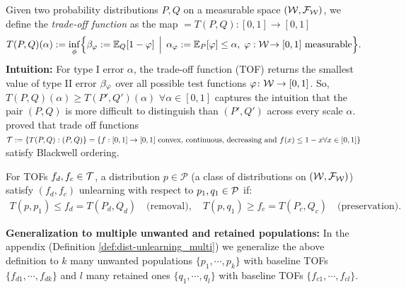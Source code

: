 \begin{definition}    \label{def:TOF} 
Given two probability distributions $P, Q$ on a measurable space $(\mathcal{W}, \mathcal{F}_{\mathcal{W}})$, we define the  \emph{trade-off function} as  the map $= T(P,Q):[0,1]\to[0,1]$  
\vspace{-1mm}
\begin{equation}\label{eq:TOF}
 T(P,Q)(\alpha):=
  \inf_{\phi}\Bigl\{
        \beta_{\varphi} := \mathbb{E}_{Q}[1-\varphi] 
        \,\Bigm\vert\,
        \alpha_{\varphi}:= \mathbb{E}_{P}[\varphi]\le \alpha,\;
        \varphi:\mathcal{W}\!\to[0,1]\text{ measurable}
      \Bigr\}.
\end{equation}
\textbf{Intuition:} For type I error $\alpha$, the trade-off function (TOF) returns the smallest value of type II error $\beta_{\varphi}$ over all possible test functions $\varphi\colon \mathcal{W}\to[0,1]$. So, $T(P,Q)(\alpha) \geq T(P',Q')(\alpha)$  $\forall \alpha \in [0,1]$ captures the intuition that the pair $(P,Q)$ is more difficult to distinguish than  $(P',Q')$ across every scale $\alpha$. \cite{dong2022gaussian} proved that  trade off functions $\mathcal{T}:=\{T(P,Q): (P,Q)\}= \{f: [0,1] \to [0,1] \text{ convex, continuous, decreasing and } f(x)\leq 1-x \forall x\in [0,1]\}$ satisfy Blackwell ordering.
\end{definition}
\begin{definition}
\label{def:dist-unlearning}
For TOFs $f_d,f_c \in \mathcal{T}$, a distribution $p \in \mathcal{P}$ (a class of distributions on $(\mathcal{W}, \mathcal{F}_{\mathcal{W}})$) satisfy $(f_d,f_c)$ unlearning with respect to $p_1, q_1 \in \mathcal{P}$ if:
\begin{align} \label{eq:dist-unlearning}
T(p, p_1) \leq f_d =T(P_d, Q_d) \quad\text{(removal)},
\quad 
T(p, q_1) \geq f_c = T(P_c, Q_c) \quad\text{(preservation)}.
\end{align}
\end{definition}
\vspace{-1mm}
\textbf{Generalization to multiple unwanted and retained populations:}
In the appendix (Definition \ref{def:dist-unlearning_multi}) we generalize the above definition  to $k$ many unwanted populations $\{p_1, \cdots, p_{k}\}$ with baseline TOFs $\{f_{d1}, \cdots, f_{dk}\}$ and $l$ many retained ones $\{q_1, \cdots, q_{l}\}$ with baseline TOFs $\{f_{c1}, \cdots, f_{cl}\}$. 

